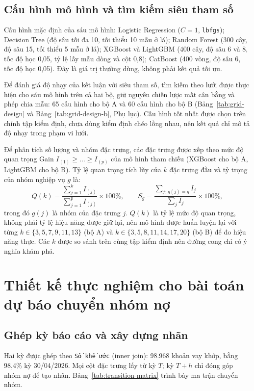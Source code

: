 \subsection{Cấu hình mô hình và tìm kiếm siêu tham số}
\label{sec:models}
\label{sec:grid-search-design}

Cấu hình mặc định của sáu mô hình: Logistic Regression ($C=1$, \texttt{lbfgs}); Decision Tree (độ sâu tối đa 10, tối thiểu 10 mẫu ở lá); Random Forest (300 cây, độ sâu 15, tối thiểu 5 mẫu ở lá); XGBoost và LightGBM (400 cây, độ sâu 6 và 8, tốc độ học 0,05, tỷ lệ lấy mẫu dòng và cột 0,8); CatBoost (400 vòng, độ sâu 6, tốc độ học 0,05). Đây là giá trị thường dùng, không phải kết quả tối ưu.

Để đánh giá độ nhạy của kết luận với siêu tham số, tìm kiếm theo lưới được thực hiện cho sáu mô hình trên cả hai bộ, giữ nguyên chiến lược mất cân bằng và phép chia mẫu: 65 cấu hình cho bộ A và 60 cấu hình cho bộ B (Bảng~\ref{tab:grid-design} và Bảng~\ref{tab:grid-design-b}, Phụ lục). Cấu hình tốt nhất được chọn trên chính tập kiểm định, chưa dùng kiểm định chéo lồng nhau, nên kết quả chỉ mô tả độ nhạy trong phạm vi lưới.

Để phân tích số lượng và nhóm đặc trưng, các đặc trưng được xếp theo mức độ quan trọng Gain $I_{(1)}\geq\dots\geq I_{(p)}$ của mô hình tham chiếu (XGBoost cho bộ A, LightGBM cho bộ B). Tỷ lệ quan trọng tích lũy của $k$ đặc trưng đầu và tỷ trọng của nhóm nghiệp vụ $g$ là:
\[
Q(k)=\frac{\sum_{j=1}^{k}I_{(j)}}{\sum_{j=1}^{p}I_{(j)}}\times100\%,
\qquad
S_g=\frac{\sum_{j:\,g(j)=g}I_j}{\sum_{j}I_j}\times100\%,
\]
trong đó $g(j)$ là nhóm của đặc trưng $j$. $Q(k)$ là tỷ lệ mức độ quan trọng, không phải tỷ lệ hiệu năng được giữ lại, nên mô hình được huấn luyện lại với từng $k\in\{3,5,7,9,11,13\}$ (bộ A) và $k\in\{3,5,8,11,14,17,20\}$ (bộ B) để đo hiệu năng thực. Các $k$ được so sánh trên cùng tập kiểm định nên đường cong chỉ có ý nghĩa khám phá.

\section{Thiết kế thực nghiệm cho bài toán dự báo chuyển nhóm nợ}
\label{sec:transition-method}

\subsection{Ghép kỳ báo cáo và xây dựng nhãn}

Hai kỳ được ghép theo \texttt{Số khế ước} (inner join): 98.968 khoản vay khớp, bằng 98,4\% kỳ 30/04/2026. Mọi cột đặc trưng lấy từ kỳ $T$; kỳ $T+h$ chỉ đóng góp nhóm nợ để tạo nhãn. Bảng~\ref{tab:transition-matrix} trình bày ma trận chuyển nhóm.

